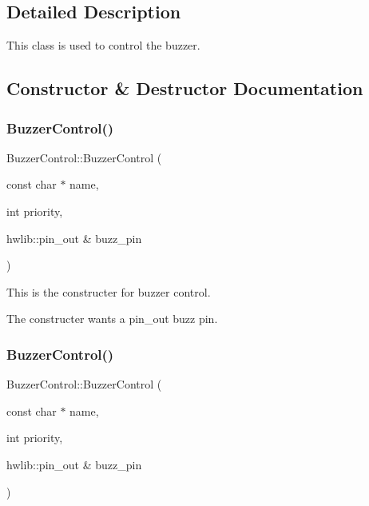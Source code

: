 \subsection{Detailed Description}
This class is used to control the buzzer. 

\subsection{Constructor \& Destructor Documentation}
\mbox{\label{class_buzzer_control_a25b3a51e33513aeeb0beb137463bbe70}} 
\subsubsection{\texorpdfstring{Buzzer\+Control()}{BuzzerControl()}\hspace{0.1cm}{\footnotesize\ttfamily [1/2]}}
{\footnotesize\ttfamily Buzzer\+Control\+::\+Buzzer\+Control (\begin{DoxyParamCaption}\item[{const char $\ast$}]{name,  }\item[{int}]{priority,  }\item[{hwlib\+::pin\+\_\+out \&}]{buzz\+\_\+pin }\end{DoxyParamCaption})\hspace{0.3cm}{\ttfamily [inline]}}



This is the constructer for buzzer control. 

The constructer wants a pin\+\_\+out buzz pin. \mbox{\label{class_buzzer_control_a25b3a51e33513aeeb0beb137463bbe70}} 
\subsubsection{\texorpdfstring{Buzzer\+Control()}{BuzzerControl()}\hspace{0.1cm}{\footnotesize\ttfamily [2/2]}}
{\footnotesize\ttfamily Buzzer\+Control\+::\+Buzzer\+Control (\begin{DoxyParamCaption}\item[{const char $\ast$}]{name,  }\item[{int}]{priority,  }\item[{hwlib\+::pin\+\_\+out \&}]{buzz\+\_\+pin }\end{DoxyParamCaption})\hspace{0.3cm}{\ttfamily [inline]}}



